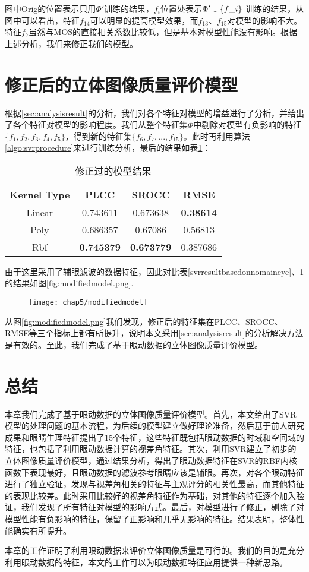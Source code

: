 图中Orig的位置表示只用$\Phi '$训练的结果，$f_i$位置处表示${\rm{ }}\Phi ' \cup \{ f\_i\}$ 训练的结果，从图中可以看出，特征$f_{14}$可以明显的提高模型效果，而$f_{13}$、$f_{15}$对模型的影响不大。特征$f_7$虽然与MOS的直接相关系数比较低，但是基本对模型性能没有影响。根据上述分析，我们来修正我们的模型。
\section{修正后的立体图像质量评价模型}
\label{sec:modifiedmodel}
根据\ref{sec:analysisresult}的分析，我们对各个特征对模型的增益进行了分析，并给出了各个特征对模型的影响程度。我们从整个特征集$\Phi$中剔除对模型有负影响的特征$\{f_1,f_2,f_3,f_{4},f_{5}\}$，得到新的特征集$\{f_6,f_7,...,f_{15}\}$。此时再利用算法\ref{algo:svrprocedure}来进行训练分析，最后的结果如表\ref{modifiedmodelresult}：
\begin{table}[]
\centering
\caption{修正过的模型结果}
\label{modifiedmodelresult}
\begin{tabular}{@{}cccc@{}}
\toprule
Kernel Type & PLCC              & SROCC             & RMSE             \\ \midrule
Linear      & 0.743611          & 0.673638          & \textbf{0.38614} \\
Poly        & 0.686357          & 0.67086           & 0.56813          \\
Rbf         & \textbf{0.745379} & \textbf{0.673779} & 0.387686         \\ \bottomrule
\end{tabular}
\end{table}
由于这里采用了辅眼滤波的数据特征，因此对比表\ref{svrresultbasedonnomaineye}、\ref{modifiedmodelresult}的结果如图\ref{fig:modifiedmodel.png}.
\begin{figure}[!htp]
  \centering
  \texttt{[image: chap5/modifiedmodel]}
\end{figure}
从图\ref{fig:modifiedmodel.png}我们发现，修正后的特征集在PLCC、SROCC、RMSE等三个指标上都有所提升，说明本文采用\ref{sec:analysisresult}的分析解决方法是有效的。至此，我们完成了基于眼动数据的立体图像质量评价模型。
\section{总结}
\label{sec:conclusionchapter5}
本章我们完成了基于眼动数据的立体图像质量评价模型。首先，本文给出了SVR模型的处理问题的基本流程，为后续的模型建立做好理论准备，然后基于前人研究成果和眼睛生理特征提出了15个特征，这些特征既包括眼动数据的时域和空间域的特征，也包括了利用眼动数据计算的视差角特征。其次，利用SVR建立了初步的立体图像质量评价模型，通过结果分析，得出了眼动数据特征在SVR的RBF内核函数下表现最好，且眼动数据的滤波参考眼睛应该是辅眼。再次，对各个眼动特征进行了独立验证，发现与视差角相关的特征与主观评分的相关性最高，而其他特征的表现比较差。此时采用比较好的视差角特征作为基础，对其他的特征逐个加入验证，我们发现了所有特征对模型的影响方式。最后，对模型进行了修正，剔除了对模型性能有负影响的特征，保留了正影响和几乎无影响的特征。结果表明，整体性能确实有所提升。

本章的工作证明了利用眼动数据来评价立体图像质量是可行的。我们的目的是充分利用眼动数据的特征，本文的工作可以为眼动数据特征应用提供一种新思路。
